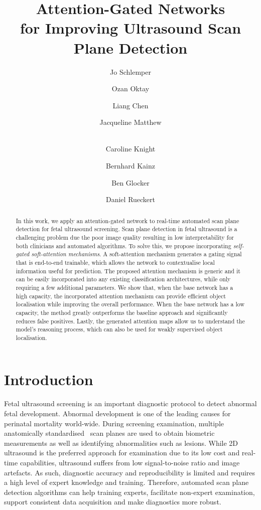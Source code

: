\documentclass{article}
\title{Attention-Gated Networks\\for Improving Ultrasound Scan Plane Detection}
\author[1]{Jo Schlemper}
\author[1]{Ozan Oktay}
\author[1]{Liang Chen}
\author[2]{Jacqueline Matthew}
\author[2]{\\Caroline Knight}
\author[1]{Bernhard Kainz}
\author[1]{Ben Glocker}
\author[1]{Daniel Rueckert}
\affil[1]{Biomedical Image Analysis Group, Imperial College London, London, UK}
\affil[2]{King's College London, London, UK}
\affil[ ]{\url{jo.schlemper11@imperial.ac.uk}}
\begin{document}
\maketitle

\begin{abstract}
In this work, we apply an attention-gated network to real-time automated scan plane detection for fetal ultrasound screening. Scan plane detection in fetal ultrasound is a challenging problem due the poor image quality resulting in low interpretability for both clinicians and automated algorithms. To solve this, we propose incorporating \emph{self-gated soft-attention mechanisms}. A soft-attention mechanism generates a gating signal that is end-to-end trainable, which allows the network to contextualise local information useful for prediction. The proposed attention mechanism is generic and it can be easily incorporated into any existing classification architectures, while only requiring a few additional parameters. We show that, when the base network has a high capacity, the incorporated attention mechanism can provide efficient object localisation while improving the overall performance. When the base network has a low capacity, the method greatly outperforms the baseline approach and significantly reduces false positives. Lastly, the generated attention maps allow us to understand the model's reasoning process, which can also be used for weakly supervised object localisation.
\end{abstract}

\section{Introduction}

Fetal ultrasound screening is an important diagnostic protocol to detect abnormal fetal development. Abnormal development is one of the leading causes for perinatal mortality world-wide. During screening examination, multiple anatomically standardised~\cite{FASP} scan planes are used to obtain biometric measurements as well as identifying abnormalities such as lesions. While 2D ultrasound is the preferred approach for examination due to its low cost and real-time capabilities, ultrasound suffers from low signal-to-noise ratio and image artefacts. As such, diagnostic accuracy and reproducibility is limited and requires a high level of expert knowledge and training. Therefore, automated scan plane detection algorithms can help training experts, facilitate non-expert examination, support consistent data acquisition and make diagnostics more robust. 
\end{document}
